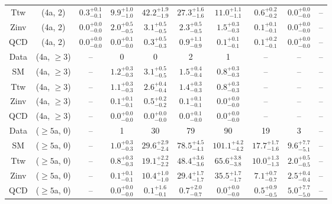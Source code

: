 \begin{table}[h!]
{\begin{tabular}{cccccccccc}
	Ttw & (4a, 2) & $0.3^{+ 0.1 }_{- 0.1 }$ & $9.9^{+ 1.0 }_{- 1.0 }$ & $42.2^{+ 1.9 }_{- 1.9 }$ & $27.3^{+ 1.6 }_{- 1.6 }$ & $11.0^{+ 1.1 }_{- 1.1 }$ & $0.6^{+ 0.2 }_{- 0.2 }$ & $0.0^{+ 0.0 }_{- 0.0 }$ & -- \\[0.5ex] 
	Zinv & (4a, 2) & $0.0^{+ 0.0 }_{- 0.0 }$ & $2.0^{+ 0.5 }_{- 0.5 }$ & $3.1^{+ 0.5 }_{- 0.5 }$ & $2.3^{+ 0.5 }_{- 0.5 }$ & $1.5^{+ 0.3 }_{- 0.3 }$ & $0.1^{+ 0.1 }_{- 0.1 }$ & $0.0^{+ 0.0 }_{- 0.0 }$ & -- \\[0.5ex] 
	QCD & (4a, 2) & $0.0^{+ 0.0 }_{- 0.0 }$ & $0.0^{+ 0.1 }_{- 0.0 }$ & $0.3^{+ 0.5 }_{- 0.3 }$ & $0.9^{+ 1.1 }_{- 0.9 }$ & $0.1^{+ 0.1 }_{- 0.1 }$ & $0.1^{+ 0.2 }_{- 0.1 }$ & $0.0^{+ 0.0 }_{- 0.0 }$ & -- \\[0.5ex] 
	Data & (4a, $\ge3$) & -- & 0 & 0 & 2 & 1 & -- & -- & -- \\[0.5ex] 
	SM & (4a, $\ge3$) & -- & $1.2^{+ 0.3 }_{- 0.3 }$ & $3.1^{+ 0.5 }_{- 0.5 }$ & $1.5^{+ 0.4 }_{- 0.4 }$ & $0.8^{+ 0.3 }_{- 0.3 }$ & -- & -- & -- \\[0.5ex] 
	Ttw & (4a, $\ge3$) & -- & $1.1^{+ 0.3 }_{- 0.3 }$ & $2.6^{+ 0.4 }_{- 0.4 }$ & $1.4^{+ 0.3 }_{- 0.3 }$ & $0.8^{+ 0.3 }_{- 0.3 }$ & -- & -- & -- \\[0.5ex] 
	Zinv & (4a, $\ge3$) & -- & $0.1^{+ 0.1 }_{- 0.1 }$ & $0.5^{+ 0.2 }_{- 0.2 }$ & $0.1^{+ 0.1 }_{- 0.1 }$ & $0.0^{+ 0.0 }_{- 0.0 }$ & -- & -- & -- \\[0.5ex] 
	QCD & (4a, $\ge3$) & -- & $0.0^{+ 0.0 }_{- 0.0 }$ & $0.0^{+ 0.0 }_{- 0.0 }$ & $0.0^{+ 0.1 }_{- 0.0 }$ & $0.0^{+ 0.0 }_{- 0.0 }$ & -- & -- & -- \\[0.5ex] 
	Data & ($\ge5$a, 0) & -- & 1 & 30 & 79 & 90 & 19 & 3 & -- \\[0.5ex] 
	SM & ($\ge5$a, 0) & -- & $1.0^{+ 0.3 }_{- 0.3 }$ & $29.6^{+ 2.9 }_{- 2.4 }$ & $78.5^{+ 4.5 }_{- 4.1 }$ & $101.1^{+ 4.2 }_{- 4.2 }$ & $17.7^{+ 1.7 }_{- 1.6 }$ & $9.6^{+ 7.7 }_{- 5.1 }$ & -- \\[0.5ex] 
	Ttw & ($\ge5$a, 0) & -- & $0.8^{+ 0.3 }_{- 0.3 }$ & $19.1^{+ 2.2 }_{- 2.2 }$ & $48.4^{+ 3.6 }_{- 3.6 }$ & $65.6^{+ 3.8 }_{- 3.8 }$ & $10.0^{+ 1.3 }_{- 1.3 }$ & $2.0^{+ 0.5 }_{- 0.5 }$ & -- \\[0.5ex] 
	Zinv & ($\ge5$a, 0) & -- & $0.1^{+ 0.1 }_{- 0.1 }$ & $10.4^{+ 1.0 }_{- 1.0 }$ & $29.4^{+ 1.7 }_{- 1.7 }$ & $35.5^{+ 1.7 }_{- 1.7 }$ & $7.1^{+ 0.7 }_{- 0.7 }$ & $2.5^{+ 0.4 }_{- 0.4 }$ & -- \\[0.5ex] 
	QCD & ($\ge5$a, 0) & -- & $0.0^{+ 0.0 }_{- 0.0 }$ & $0.1^{+ 1.6 }_{- 0.1 }$ & $0.7^{+ 2.0 }_{- 0.7 }$ & $0.0^{+ 0.0 }_{- 0.0 }$ & $0.5^{+ 0.9 }_{- 0.5 }$ & $5.0^{+ 7.7 }_{- 5.0 }$ & -- \\[0.5ex] 

\end{tabular}}
\end{table}
